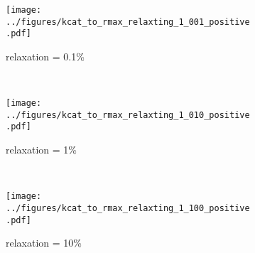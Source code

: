 \documentclass{article}
\begin{document}
\begin{figure}[!htb]
        \center
        \begin{subfigure}[b]{0.3\textwidth}
                \texttt{[image: ../figures/kcat\_to\_rmax\_relaxting\_1\_001\_positive.pdf]}
                \caption{relaxation = 0.1\%}
        \end{subfigure}%
        ~ %
        \begin{subfigure}[b]{0.3\textwidth}
                \texttt{[image: ../figures/kcat\_to\_rmax\_relaxting\_1\_010\_positive.pdf]}
                \caption{relaxation = 1\%}
        \end{subfigure}
        ~ %
        \begin{subfigure}[b]{0.3\textwidth}
                \texttt{[image: ../figures/kcat\_to\_rmax\_relaxting\_1\_100\_positive.pdf]}
                \caption{relaxation = 10\%}
        \end{subfigure}
    \caption{}
	\label{fig:positive_std}	
\end{figure}
 
\end{document}
